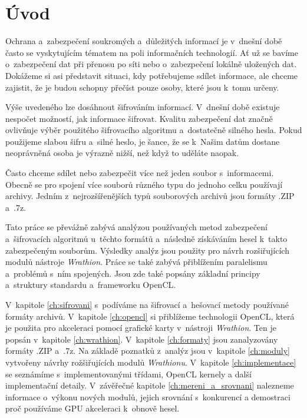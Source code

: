 \chapter{Úvod}
Ochrana a~zabezpečení soukromých a~důležitých informací je v~dnešní době často se vyskytujícím
tématem na poli informačních technologií. Ať už se bavíme o~zabezpečení dat při přenosu po síti
nebo o~zabezpečení lokálně uložených dat. Dokážeme si asi představit situaci, kdy potřebujeme
sdílet informace, ale chceme zajistit, že je budou schopny přečíst pouze osoby, které jsou k~tomu
určeny.

 Výše uvedeného lze dosáhnout šifrováním informací. V~dnešní době existuje nespočet možností, jak
informace šifrovat. Kvalitu zabezpečení dat značně ovlivňuje výběr použitého šifrovacího
algoritmu a~dostatečně silného hesla. Pokud použijeme slabou šifru a~silné heslo, je
šance, že se k~Našim datům dostane neoprávněná osoba je výrazně nižší, než když to uděláte naopak.

 Často chceme sdílet nebo zabezpečit více než jeden soubor s~informacemi. Obecně se pro
spojení více souborů různého typu do jednoho celku používají archivy. Jedním z~nejrozšířenějších
typů souborových archivů jsou formáty .ZIP a~.7z.

 Tato práce se převážně zabývá analýzou používaných metod zabezpečení a~šifrovacích
algoritmů u~těchto formátů a~následně získáváním hesel k~takto zabezpečeným souborům. Výsledky
analýz jsou použity pro návrh rozšiřujících modulů nástroje {\it Wrathion}. Práce se také
zabývá přiblížením paralelismu a~problémů s~ním spojených. Jsou zde také popsány základní
principy a~struktury standardu a~frameworku OpenCL.

 V~kapitole \ref{ch:sifrovani} s~podíváme na šifrovací a~hešovací metody používané formáty
archivů. V~kapitole \ref{ch:opencl} si přiblížeme technologii OpenCL, která je použita pro
akceleraci pomocí grafické karty v~nástroji {\it Wrathion}. Ten je popsán v~kapitole
\ref{ch:wrathion}. V~kapitole \ref{ch:formaty} jsou zanalyzovány formáty .ZIP a~.7z. Na základě
poznatků z~analýz jsou v~kapitole \ref{ch:moduly} vytvořeny návrhy rožšiřujících modulů {\it
Wrathionu}. V~kapitole \ref{ch:implementace} se seznámíme s~implementovanými třídami, OpenCL
kernely a další implementační detaily. V~závěřečné kapitole \ref{ch:mereni_a_srovnani} nalezneme
informace o~výkonu nových modulů, jejich srovnání s~konkurencí a demostraci proč používáme GPU
akceleraci k~obnově hesel.
